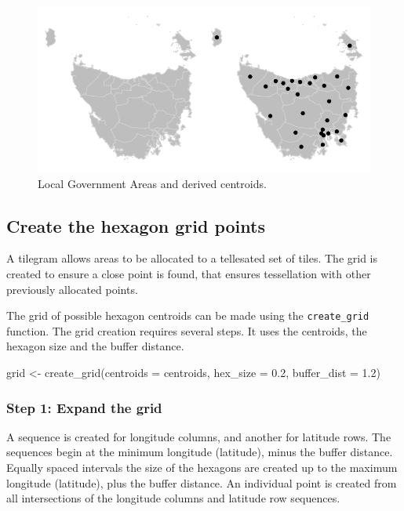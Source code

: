 \begin{Schunk}
\begin{figure}
\includegraphics{algorithmRjournal_files/figure-latex/end_cents-1} \caption[Local Government Areas and derived centroids]{Local Government Areas and derived centroids.}\label{fig:end_cents}
\end{figure}
\end{Schunk}

\hypertarget{create-the-hexagon-grid-points}{%
\subsection{Create the hexagon grid
points}\label{create-the-hexagon-grid-points}}

A tilegram allows areas to be allocated to a tellesated set of tiles.
The grid is created to ensure a close point is found, that ensures
tessellation with other previously allocated points.

The grid of possible hexagon centroids can be made using the
\texttt{create\_grid} function. The grid creation requires several
steps. It uses the centroids, the hexagon size and the buffer distance.

\begin{Schunk}
\begin{Sinput}
grid <- create_grid(centroids = centroids, hex_size = 0.2, buffer_dist = 1.2)
\end{Sinput}
\end{Schunk}

\hypertarget{step-1-expand-the-grid}{%
\subsubsection{Step 1: Expand the grid}\label{step-1-expand-the-grid}}

A sequence is created for longitude columns, and another for latitude
rows. The sequences begin at the minimum longitude (latitude), minus the
buffer distance. Equally spaced intervals the size of the hexagons are
created up to the maximum longitude (latitude), plus the buffer
distance. An individual point is created from all intersections of the
longitude columns and latitude row sequences.

